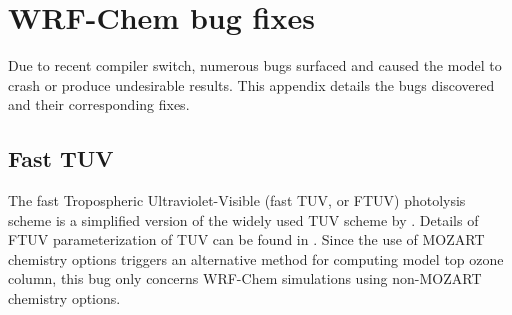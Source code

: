 \chapter{WRF-Chem bug fixes} \label{apdx:bug}

\ifpdf
    \graphicspath{{Appendix/figures/PNG/}{Appendix/figures/PDF/}{Appendix/figures/}}
\else
    \graphicspath{{Appendix/figures/EPS/}{Appendix/figures/}}
\fi

Due to recent compiler switch, numerous bugs surfaced and caused the model to crash or produce undesirable results. This appendix details the bugs discovered and their corresponding fixes.

\section{Fast TUV}\label{a-sec:bug/ftuv}

The fast Tropospheric Ultraviolet-Visible (fast TUV, or FTUV) photolysis scheme is a simplified version of the widely used TUV scheme by \citet{Madronich:1987uq}. Details of FTUV parameterization of TUV can be found in \citet{Tie:2003ve}. Since the use of MOZART chemistry options triggers an alternative method for computing model top ozone column, this bug only concerns WRF-Chem simulations using non-MOZART chemistry options.

